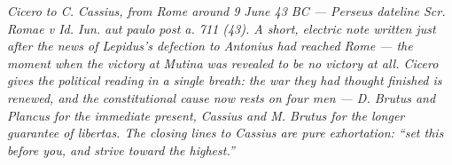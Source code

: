 
\textit{Cicero to C. Cassius, from Rome around 9 June 43 BC ---
Perseus dateline \textit{Scr. Romae v Id. Iun. aut paulo post a. 711 (43)}.
A short, electric note written just after the news of Lepidus's defection to
Antonius had reached Rome --- the moment when the victory at Mutina was
revealed to be no victory at all. Cicero gives the political reading in a
single breath: the war they had thought finished is renewed, and the
constitutional cause now rests on four men --- D. Brutus and Plancus for the
immediate present, Cassius and M. Brutus for the longer guarantee of
\emph{libertas}. The closing lines to Cassius are pure exhortation: ``set
this before you, and strive toward the highest.''}
